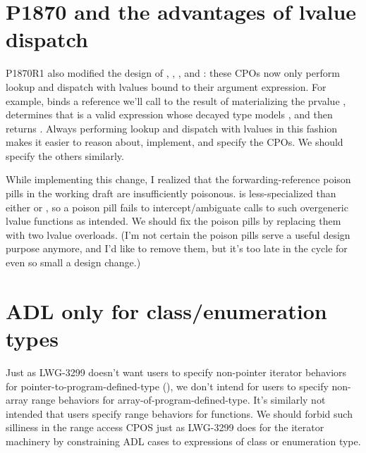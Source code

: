 \section{P1870 and the advantages of lvalue dispatch}

P1870R1 also modified the design of
, , , and :
these CPOs now only perform lookup and dispatch
with lvalues bound to their argument expression.
For example,  binds
a reference we'll call  to the result of materializing
the prvalue ,
determines that  is a valid expression
whose decayed type models ,
and then returns .
Always performing lookup and dispatch with lvalues in this fashion
makes it easier to reason about, implement, and specify the CPOs.
We should specify the others similarly.

While implementing this change,
I realized that the forwarding-reference poison pills in the working draft
are insufficiently poisonous.
 is less-specialized than either
 or ,
so a  poison pill fails to intercept/ambiguate
calls to such overgeneric lvalue functions as intended.
We should fix the poison pills by replacing them with two lvalue overloads.
(I'm not certain the poison pills serve a useful design purpose anymore,
and I'd like to remove them,
but it's too late in the cycle for even so small a design change.)


\section{ADL only for class/enumeration types}

Just as LWG-3299 doesn't want users to specify non-pointer iterator behaviors
for pointer-to-program-defined-type (\cite{lwg3299}),
we don't intend for users to specify
non-array range behaviors for array-of-program-defined-type.
It's similarly not intended that users specify range behaviors for functions.
We should forbid such silliness in the range access CPOS
just as LWG-3299 does for the iterator machinery
by constraining ADL cases to expressions of class or enumeration type.


